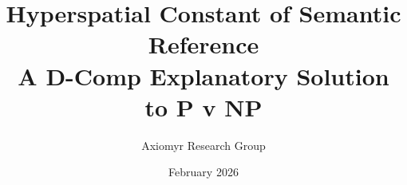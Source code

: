 %



\usepackage{tikz}
\usetikzlibrary{arrows, positioning, shapes, calc}
\usepackage{cleveref}
\usepackage{booktabs} %

\newcommand{\ALQC}{A\textsubscript{LQC}}
\newcommand{\DComp}{\mathcal{D}\text{-}\mathrm{COMP}}
\newcommand{\TSP}{\mathrm{TSP}}
\newcommand{\HRBR}{\mathfrak{HRBR}}
\newcommand{\MAn}{\mathrm{Man}}
\newcommand{\MA}{\mathrm{A}}

\title{Hyperspatial Constant of Semantic Reference\\
\large A D-Comp Explanatory Solution to P v NP}

\author{Axiomyr Research Group}

\date{February 2026}



\maketitle

